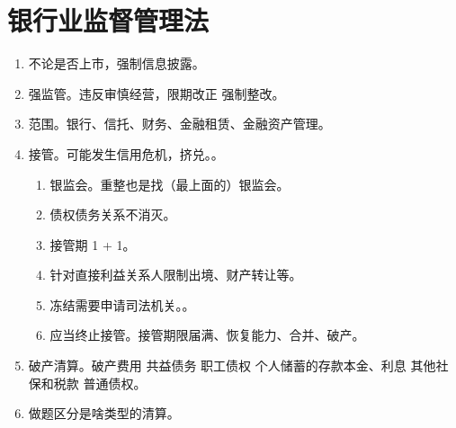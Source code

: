 \section{银行业监督管理法}
\begin{enumerate}
  \item 不论是否上市，强制信息披露。
  \item 强监管。违反审慎经营，限期改正 \yjt 强制整改。
  \item 范围。银行、信托、财务、金融租赁、金融资产管理。
  \item 接管。可能发生信用危机，挤兑。。
        \begin{enumerate}
          \item 银监会。重整也是找（最上面的）银监会。
          \item 债权债务关系不消灭。
          \item 接管期 1 + 1。
          \item 针对直接利益关系人限制出境、财产转让等。
          \item 冻结需要申请司法机关。。
          \item 应当终止接管。接管期限届满、恢复能力、合并、破产。
        \end{enumerate}
  \item 破产清算。破产费用 \dy 共益债务 \dy 职工债权 \dy 个人储蓄的存款本金、利息 \dy 其他社保和税款 \dy 普通债权。
  \item 做题区分是啥类型的清算。
\end{enumerate}
